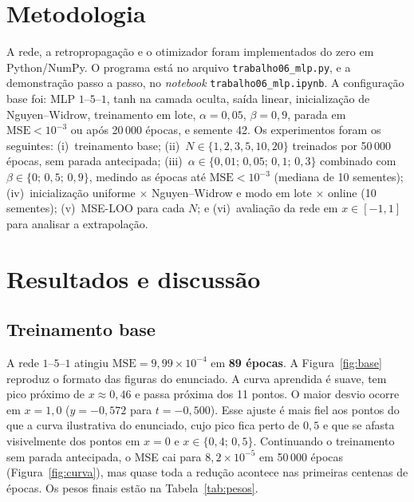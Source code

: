 \documentclass[12pt,oneside,a4paper,english,brazil]{abntex2}
\newcommand{\mse}{\mathrm{MSE}}
\begin{document}
\section{Metodologia}
A rede, a retropropagação e o otimizador foram implementados do zero em
Python/NumPy. O programa está no arquivo \texttt{trabalho06\_mlp.py}, e a
demonstração passo a passo, no \textit{notebook} \texttt{trabalho06\_mlp.ipynb}. A configuração base foi: MLP
$1$--$5$--$1$, tanh na camada oculta, saída linear, inicialização de
Nguyen--Widrow, treinamento em lote, $\alpha=0{,}05$, $\beta=0{,}9$, parada em
$\mse<10^{-3}$ ou após 20\,000 épocas, e semente 42. Os experimentos foram os
seguintes:
(i)~treinamento base;
(ii)~$N\in\{1,2,3,5,10,20\}$ treinados por 50\,000 épocas, sem parada
antecipada;
(iii)~$\alpha\in\{0{,}01;\,0{,}05;\,0{,}1;\,0{,}3\}$ combinado com
$\beta\in\{0;\,0{,}5;\,0{,}9\}$,
medindo as épocas até $\mse<10^{-3}$ (mediana de 10 sementes);
(iv)~inicialização uniforme $\times$ Nguyen--Widrow e modo em lote $\times$
online (10 sementes);
(v)~MSE-LOO para cada $N$; e
(vi)~avaliação da rede em $x\in[-1,1]$ para analisar a extrapolação.

\section{Resultados e discussão}\label{cap:resultados}

\subsection{Treinamento base}
A rede $1$--$5$--$1$ atingiu $\mse=9{,}99\times10^{-4}$ em \textbf{89 épocas}.
A Figura~\ref{fig:base} reproduz o formato das figuras do enunciado. A curva
aprendida é suave, tem pico próximo de $x\approx0{,}46$ e passa próxima dos 11
pontos. O maior desvio ocorre em $x=1{,}0$ ($y=-0{,}572$ para $t=-0{,}500$).
Esse ajuste é mais fiel aos pontos do que a curva ilustrativa do enunciado,
cujo pico fica perto de $0{,}5$ e que se afasta visivelmente dos pontos em
$x=0$ e $x\in\{0{,}4;\,0{,}5\}$. Continuando o treinamento sem parada
antecipada, o MSE cai para $8{,}2\times10^{-5}$ em 50\,000 épocas
(Figura~\ref{fig:curva}), mas quase toda a redução acontece nas primeiras
centenas de épocas. Os pesos finais estão na Tabela~\ref{tab:pesos}.
\end{document}
